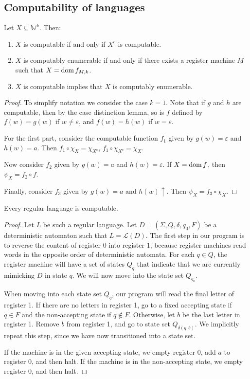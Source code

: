 \subsection{Computability of languages}
\begin{proposition}
	Let \( X \subseteq \mathbb W^k \).
	Then:
	\begin{enumerate}
		\item \( X \) is computable if and only if \( X^c \) is computable.
		\item \( X \) is computably enumerable if and only if there exists a register machine \( M \) such that \( X = \operatorname{dom} f_{M,k} \).
		\item \( X \) is computable implies that \( X \) is computably enumerable.
	\end{enumerate}
\end{proposition}
\begin{proof}
	To simplify notation we consider the case \( k = 1 \).
	Note that if \( g \) and \( h \) are computable, then by the case distinction lemma, so is \( f \) defined by \( f(w) = g(w) \) if \( w \neq \varepsilon \), and \( f(w) = h(w) \) if \( w = \varepsilon \).

	For the first part, consider the computable function \( f_1 \) given by \( g(w) = \varepsilon \) and \( h(w) = a \).
	Then \( f_1 \circ \chi_X = \chi_{X^c} \), \( f_1 \circ \chi_{X^c} = \chi_X \).

	Now consider \( f_2 \) given by \( g(w) = a \) and \( h(w) = \varepsilon \).
	If \( X = \operatorname{dom} f \), then \( \psi_X = f_2 \circ f \).

	Finally, consider \( f_3 \) given by \( g(w) = a \) and \( h(w) \uparrow \).
	Then \( \psi_X = f_3 \circ \chi_X \).
\end{proof}
\begin{theorem}
	Every regular language is computable.
\end{theorem}
\begin{proof}
	Let \( L \) be such a regular language.
	Let \( D = (\Sigma, Q, \delta, q_0, F) \) be a deterministic automaton such that \( L = \mathcal L(D) \).
	The first step in our program is to reverse the content of register 0 into register 1, because register machines read words in the opposite order of deterministic automata.
	For each \( q \in Q \), the register machine will have a set of states \( Q_q \) that indicate that we are currently mimicking \( D \) in state \( q \).
	We will now move into the state set \( Q_{q_0} \).

	When moving into each state set \( Q_q \), our program will read the final letter of register 1.
	If there are no letters in register 1, go to a fixed accepting state if \( q \in F \) and the non-accepting state if \( q \not\in F \).
	Otherwise, let \( b \) be the last letter in register 1.
	Remove \( b \) from register 1, and go to state set \( Q_{\delta(q,b)} \).
	We implicitly repeat this step, since we have now transitioned into a state set.

	If the machine is in the given accepting state, we empty register 0, add \( a \) to register 0, and then halt.
	If the machine is in the non-accepting state, we empty register 0, and then halt.
\end{proof}

